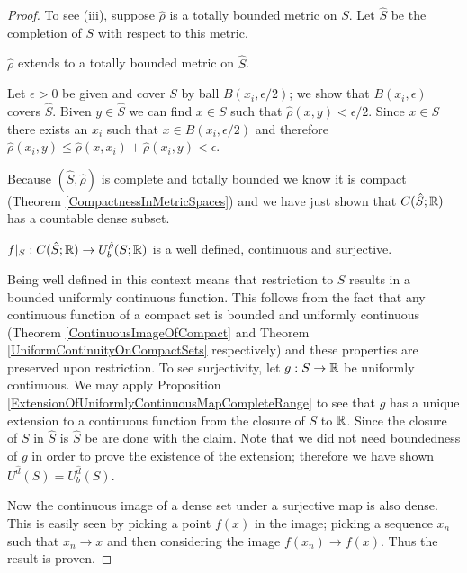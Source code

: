 \begin{proof}
To see (iii), suppose $\hat{\rho}$ is a totally bounded metric on
$S$.  Let $\hat{S}$ be the completion of $S$ with respect to
this metric.  

\begin{clm}$\hat{\rho}$ extends to a totally bounded
metric on $\hat{S}$.  
\end{clm}

Let $\epsilon>0$ be given and cover $S$ by ball
$B(x_i, \epsilon/2)$; we show that $B(x_i, \epsilon)$ covers
$\hat{S}$.  Biven $y \in \hat{S}$ we can find $x \in
S$ such that $\hat{\rho}(x,y) < \epsilon/2$.  Since $x \in S$ there
exists an $x_i$ such that $x \in B(x_i, \epsilon/2)$ and therefore
$\hat{\rho}(x_i,y) \leq \hat{\rho}(x,x_i) + \hat{\rho}(x_i,y) <
\epsilon$.

Because $(\hat{S},\hat{\rho})$ is complete and totally bounded we know
it is compact (Theorem \ref{CompactnessInMetricSpaces}) and we have
just shown that $C(\hat{S} ; \mathbb{R})$ has a countable dense subset.

\begin{clm}$f\vert_S : C(\hat{S} ; \mathbb{R}) \to U_b^{\hat{\rho}}(S ;
\mathbb{R})$ is a well defined, continuous and surjective.
\end{clm}

Being well defined in this context means that restriction to $S$
results in a bounded uniformly continuous function.  This follows
from the fact that any continuous function of a compact set is bounded
and uniformly continuous (Theorem \ref{ContinuousImageOfCompact} and
Theorem \ref{UniformContinuityOnCompactSets} respectively) and these
properties are preserved upon restriction.  To see surjectivity, let
$g : S \to \mathbb{R}$ be uniformly continuous.  We may apply Proposition
\ref{ExtensionOfUniformlyContinuousMapCompleteRange} to see that $g$ has a unique extension
to a continuous function from the closure of $S$ to $\mathbb{R}$.  Since the closure of $S$ in $\hat{S}$ is
$\hat{S}$ be are done with the claim.  Note that we did not need boundedness of $g$ in order to prove the existence of the extension;
therefore we have shown $U^{\hat{d}}(S) = U^{\hat{d}}_b(S)$.

Now the continuous image of a dense set under a surjective map is also
dense.  This is easily seen by picking a point $f(x)$ in the image;
picking a sequence $x_n$ such that $x_n \to x$ and then considering
the image $f(x_n) \to f(x)$.  Thus the result is proven.
\end{proof}


